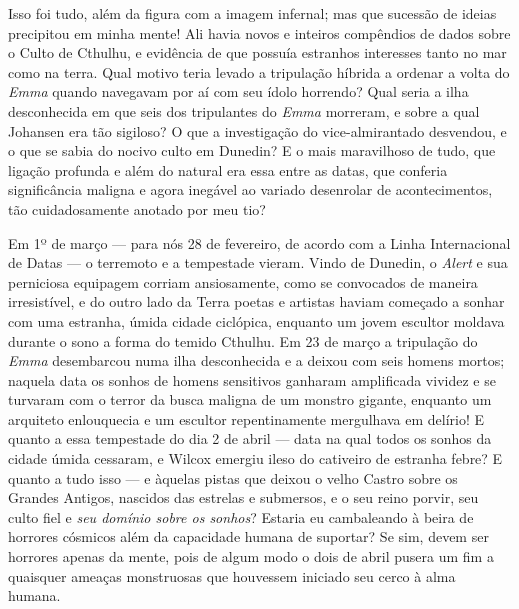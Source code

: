 \begin{pages}
\begin{Rightside}
Isso foi tudo, além da figura com a imagem infernal; mas que sucessão de
ideias precipitou em minha mente! Ali havia novos e inteiros compêndios
de dados sobre o Culto de Cthulhu, e evidência de que possuía estranhos
interesses tanto no mar como na terra. Qual motivo teria levado a
tripulação híbrida a ordenar a volta do \emph{Emma} quando navegavam por
aí com seu ídolo horrendo? Qual seria a ilha desconhecida em que seis
dos tripulantes do \emph{Emma} morreram, e sobre a qual Johansen era tão
sigiloso? O que a investigação do vice-almirantado desvendou, e o que se
sabia do nocivo culto em Dunedin? E o mais maravilhoso de tudo, que
ligação profunda e além do natural era essa entre as datas, que conferia
significância maligna e agora inegável ao variado desenrolar de
acontecimentos, tão cuidadosamente anotado por meu tio?

Em 1º de março --- para nós 28 de fevereiro, de
acordo com a Linha Internacional de Datas --- o terremoto e a tempestade
vieram. Vindo de Dunedin, o \emph{Alert} e sua perniciosa equipagem
corriam ansiosamente, como se convocados de maneira irresistível, e do
outro lado da Terra poetas e artistas haviam começado a sonhar com uma
estranha, úmida cidade ciclópica, enquanto um jovem escultor moldava
durante o sono a forma do temido Cthulhu. Em 23 de março a tripulação do
\emph{Emma} desembarcou numa ilha desconhecida e a deixou com seis
homens mortos; naquela data os sonhos de homens sensitivos ganharam
amplificada vividez e se turvaram com o terror da busca maligna de um
monstro gigante, enquanto um arquiteto enlouquecia e um escultor
repentinamente mergulhava em delírio! E quanto a essa tempestade do dia
2 de abril --- data na qual todos os sonhos da cidade úmida cessaram, e
Wilcox emergiu ileso do cativeiro de estranha febre? E quanto a tudo
isso --- e àquelas pistas que deixou o velho Castro sobre os Grandes
Antigos, nascidos das estrelas e submersos, e o seu reino porvir, seu
culto fiel e \emph{seu domínio sobre os sonhos}? Estaria eu cambaleando
à beira de horrores cósmicos além da capacidade humana de suportar? Se
sim, devem ser horrores apenas da mente, pois de algum modo o dois de
abril pusera um fim a quaisquer ameaças monstruosas que houvessem
iniciado seu cerco à alma humana.


\end{Rightside}
\end{pages}

